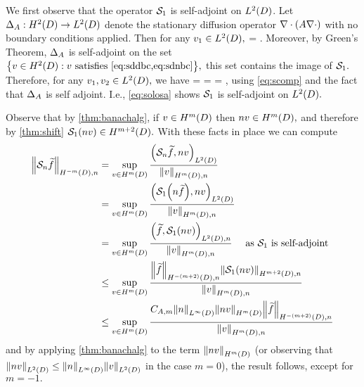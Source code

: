 We first observe that the operator $\mathcal S_{1}$ is self-adjoint on $\LtD$. Let $\DeltaA:\HtD\rightarrow\LtD$ denote the stationary diffusion operator $\grad\cdot\mleft(A\grad\cdot\mright)$ with no boundary conditions applied. Then for any $\vo \in \LtD,$
\beq\label{eq:scomp}
\DeltaA \circ \sdsolo \vo = \vo.
\eeq
Moreover, by Green's Theorem, $\Delta_{A}$ is self-adjoint on the set $\set{v \in \HtD \st v \text{ satisfies \cref{eq:sddbc,eq:sdnbc}}},$ this set contains the image of $\mathcal S_{1}.$ Therefore, for any $\vo,\vt \in \LtD,$ we have
\beq\label{eq:solosa}
\IPLtD{\sdsolo \vo}{\vt} =\IPLtD{\sdsolo \vo}{\DeltaA \circ \sdsolo \vt} = \IPLtD{\DeltaA \circ \sdsolo \vo}{\sdsolo \vt} = \IPLtD{\vo}{\sdsolo \vt},
\eeq
using \cref{eq:scomp} and the fact that $\Delta_{A}$ is self adjoint. I.e., \cref{eq:solosa} shows $\mathcal S_{1}$ is self-adjoint on $\LtD.$

Observe that by \cref{thm:banachalg}, if $v \in \HmD$ then $nv \in \HmD,$ and therefore by \cref{thm:shift} $\sdsolo(nv) \in \HmptD.$ With these facts in place we can compute
\begin{align*}
\NHnfn{-m}{D}{\sdsol \ftilde} &= \sup_{v \in \HmD} \frac{\IPLtD{\sdsol \ftilde}{nv}}{\NHmDn{v}}\\
&= \sup_{v \in \HmD} \frac{\IPLtD{\sdsolo\mleft(n \ftilde\mright)}{nv}}{\NHmDn{v}}\\
&= \sup_{v \in \HmD} \frac{\IPLtDn{\ftilde}{\sdsolo\mleft(n v\mright)}}{\NHmDn{v}}\quad\tas \sdsolo \text{ is self-adjoint}\\
&\leq \sup_{v \in \HmD} \frac{\NHnfn{-(m+2)}{D}{\ftilde}\NHnfn{m+2}{D}{\sdsolo\mleft(nv\mright)} }{\NHmDn{v}}\\
&\leq \sup_{v \in \HmD}  \frac{\CAfn{m} \NLiD{n} \NHmD{nv} \NHnfn{-(m+2)}{D}{\ftilde}}{\NHmDn{v}}
\end{align*}
and by applying \cref{thm:banachalg} to the term $\NHfn{m}{D}{nv}$ (or observing that $\NLtD{nv} \leq \NLiD{n}\NLtD{v}$ in the case $m=0$), the result follows, except for $m=-1.$

